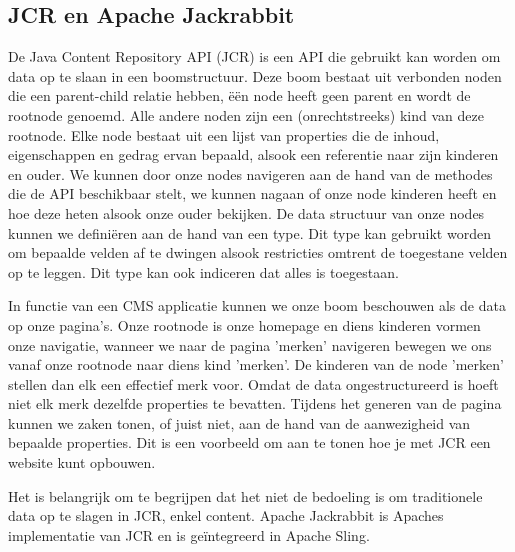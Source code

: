 \documentclass{article}
\begin{document}
	\subsection{JCR en Apache Jackrabbit}
	De Java Content Repository API (JCR) is een API die gebruikt kan worden om data op te slaan in een boomstructuur. Deze boom bestaat uit verbonden noden die een parent-child relatie hebben, \"e\"en node heeft geen parent en wordt de rootnode genoemd. Alle andere noden zijn een (onrechtstreeks) kind van deze rootnode. Elke node bestaat uit een lijst van properties die de inhoud, eigenschappen en gedrag ervan bepaald, alsook een referentie naar zijn kinderen en ouder. We kunnen door onze nodes navigeren aan de hand van de methodes die de API beschikbaar stelt, we kunnen nagaan of onze node kinderen heeft en hoe deze heten alsook onze ouder bekijken. De data structuur van onze nodes kunnen we defini\"eren aan de hand van een type. Dit type kan gebruikt worden om bepaalde velden af te dwingen alsook restricties omtrent de toegestane velden op te leggen. Dit type kan ook indiceren dat alles is toegestaan. 
	\par
	In functie van een CMS applicatie kunnen we onze boom beschouwen als de data op onze pagina's. Onze rootnode is onze homepage en diens kinderen vormen onze navigatie, wanneer we naar de pagina 'merken' navigeren bewegen we ons vanaf onze rootnode naar diens kind 'merken'. De kinderen van de node 'merken' stellen dan elk een effectief merk voor. Omdat de data ongestructureerd is hoeft niet elk merk dezelfde properties te bevatten. Tijdens het generen van de pagina kunnen we zaken tonen, of juist niet, aan de hand van de aanwezigheid van bepaalde properties. Dit is een voorbeeld om aan te tonen hoe je met JCR een website kunt opbouwen.
	\par
	Het is belangrijk om te begrijpen dat het niet de bedoeling is om traditionele data op te slagen in JCR, enkel content. Apache Jackrabbit is Apaches implementatie van JCR en is ge\"integreerd in Apache Sling.
\end{document}
